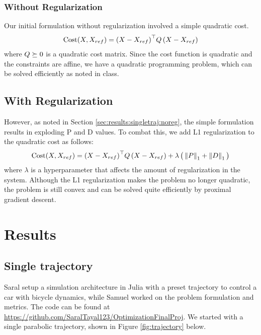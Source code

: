 \documentclass[11pt]{article}
\begin{document}
    \subsubsection{Without Regularization} \label{sec:prob:pdoptim:noreg}
    Our initial formulation without regularization involved a simple quadratic cost.
    \begin{align*}
        \mathrm{Cost}(X, X_{ref}) = {\left(X - X_{ref}\right)}^{\top} Q \left(X - X_{ref}\right)
    \end{align*}
    where $Q \succeq 0 $ is a quadratic cost matrix. Since the cost function is quadratic and the constraints are affine, we have a quadratic programming problem, which can be solved efficiently as noted in class.
    
    \subsection{With Regularization} \label{sec:prob:pdoptim:wreg}
    However, as noted in Section \ref{sec:results:singletraj:noreg}, the simple formulation results in exploding P and D values. To combat this, we add L1 regularization to the quadratic cost as follows:
    \begin{align*}
        \mathrm{Cost}(X, X_{ref}) = {\left(X - X_{ref}\right)}^{\top} Q \left(X - X_{ref}\right) + \lambda \left(\strut \left\lVert P\right\rVert_1 + \left\lVert D\right\rVert_1 \strut \right)
    \end{align*}
    where $\lambda$ is a hyperparameter that affects the amount of regularization in the system. Although the L1 regularization makes the problem no longer quadratic, the problem is still convex and can be solved quite efficiently by proximal gradient descent.
    
    \section{Results} \label{sec:results}
    \subsection{Single trajectory} \label{sec:results:singletraj}
    Saral setup a simulation architecture in Julia with a preset trajectory to control a car with bicycle dynamics, while Samuel worked on the problem formulation and metrics. The code can be found at \href{https://github.com/SaralTayal123/OptimizationFinalProj}{https://github.com/SaralTayal123/OptimizationFinalProj}. We started with a single parabolic trajectory, shown in Figure \ref{fig:trajectory} below.
    
\end{document}
